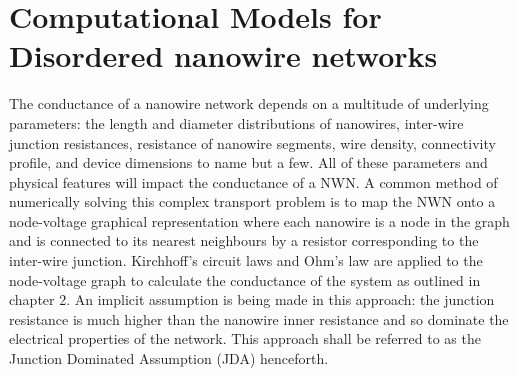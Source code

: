 \chapter{Computational Models for Disordered nanowire networks}
The conductance of a nanowire network depends on a multitude of underlying parameters: the length and diameter distributions of nanowires\cite{hecht2006,bergin2012,sorel2012,hicks2009,pike1974}, inter-wire junction resistances\cite{mutiso2013}, resistance of nanowire segments{\cite{zezelj2012}, wire density\cite{balberg1983}}, connectivity profile, and device dimensions\cite{fairfield2014} to name but a few. All of these parameters and physical features will impact the conductance of a NWN. A common method of numerically solving this complex transport problem\cite{kirkpatrick1973} is to map the NWN onto a node-voltage graphical representation where each nanowire is a node in the graph and is connected to its nearest neighbours by a resistor corresponding to the inter-wire junction. Kirchhoff's circuit laws and Ohm's law are applied to the node-voltage graph to calculate the conductance of the system as outlined in chapter 2\cite{graph_book}. An implicit assumption is being made in this approach: the junction resistance is much higher than the nanowire inner resistance and so dominate the electrical properties of the network. This approach shall be referred to as the Junction Dominated Assumption (JDA) henceforth. 

